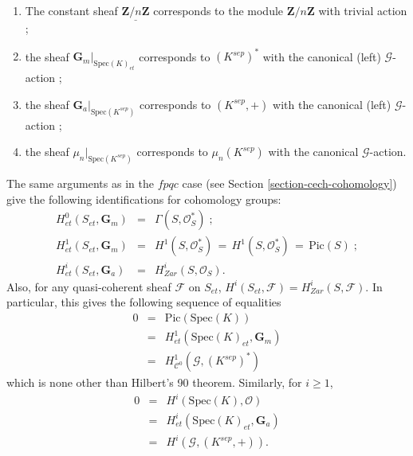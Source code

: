 \begin{example} $ $
\begin{enumerate}
\item The constant sheaf $\underline{\mathbf{Z}/n\mathbf{Z}}$ corresponds to 
the module $\mathbf{Z}/n\mathbf{Z}$ with trivial action ; 
\item the sheaf $\mathbf{G}_m|_{\text{Spec}(K)_{et}}$ corresponds to 
$(K^{sep})^*$ with the canonical (left) $\mathcal{G}$-action ;
\item the sheaf $\mathbf{G}_a|_{\text{Spec}(K^{sep})}$ corresponds to 
$(K^{sep}, +)$ with the canonical (left) $\mathcal{G}$-action ;
\item the sheaf $\mu_n|_{\text{Spec}(K^{sep})}$ corresponds to $\mu_n(K^{sep})$ 
with the canonical $\mathcal{G}$-action.
\end{enumerate}

\noindent
The same arguments as in the $fpqc$ case (see
Section \ref{section-cech-cohomology})
give the following identifications for cohomology groups:
$$
\begin{array}{ccl}
H_{et}^0(S_{et}, \mathbf{G}_m) & = & \Gamma(S, \mathcal{O}_S^*) \; ; \\
H_{et}^1(S_{et}, \mathbf{G}_m) & = & H^1(S, \mathcal{O}_S^*) \, = \,  H^1(S, 
\mathcal{O}_S^*) \, = \, \text{Pic}(S) \; ;\\
H_{et}^i(S_{et}, \mathbf{G}_a) & = & H_{Zar}^i(S, \mathcal{O}_S).
\end{array}
$$
Also, for any quasi-coherent sheaf $\mathcal{F}$ on $S_{et}$, $H^i(S_{et}, 
\mathcal{F}) = H_{Zar}^i(S, \mathcal{F})$.
In particular, this gives the following sequence of equalities
\begin{eqnarray*}
0 & = & \text{Pic}(\text{Spec}(K)) \\
& = & H_{et}^1(\text{Spec}(K)_{et}, \mathbf{G}_m) \\
& = & H^1_{\mathcal{C}^0}(\mathcal{G}, (K^{sep})^*) 
\end{eqnarray*}
which is none other than Hilbert's 90 theorem. Similarly, for $i \geq 1$,
\begin{eqnarray*}
0 & = & H^i(\text{Spec}(K), \mathcal{O}) \\
&  = & H_{et}^i(\text{Spec}(K)_{et}, \mathbf{G}_a) \\
& = & H^i(\mathcal{G}, (K^{sep}, +)).
\end{eqnarray*}
\end{example}


